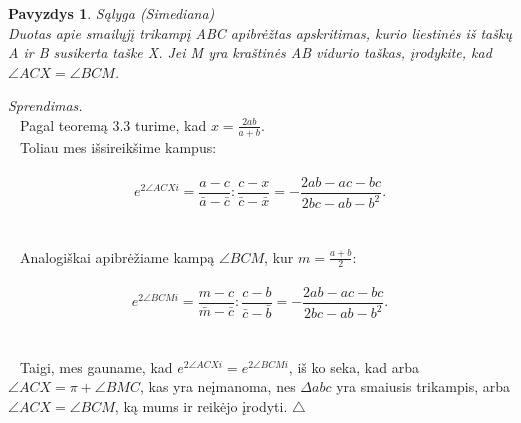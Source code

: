 \documentclass[11pt,a4paper,twoside]{book}
\newenvironment{sprendimas}{\noindent \textit{Sprendimas.}}{\hfill $\triangle$}
\newcounter{foo}[subsection]
\newtheorem{pavnr}[foo]{Pavyzdys}
\theoremstyle{definition} \newtheorem*{api}{Apibrėžimas}
\theoremstyle{remark} \newtheorem*{pastaba}{Pastaba}
\begin{document}
     \begin{pavnr}
Sąlyga (Simediana)
\\ Duotas apie smailųjį trikampį ABC apibrėžtas apskritimas, kurio
liestinės iš taškų A ir B susikerta taške X. Jei M yra kraštinės 
AB vidurio taškas, įrodykite, kad $\angle ACX = \angle BCM$.
\end{pavnr}
\begin{sprendimas}
\\ $\phantom{a}$ Pagal teoremą 3.3 turime, kad $ x= \frac {2ab}{a+b}$.
\\$\phantom{a}$ Toliau mes išsireikšime kampus:
\\
\\ $$ e^{ 2\angle ACX i} = \frac { a-c}{ \bar a - \bar c} : \frac {c-x}{\bar c - \bar x}=
- \frac { 2ab -ac-bc}{2bc - ab- b^2}.$$
\\
\\$\phantom{a}$ Analogiškai apibrėžiame kampą $ \angle BCM $, kur $m = \frac {a+b}{2}$:
\\
\\  $$ e^{2 \angle BCM i} = \frac { m-c}{ \bar m - \bar c} : \frac {c-b}{\bar c - \bar b}=
- \frac { 2ab -ac-bc}{2bc - ab- b^2}.$$
\\
\\$\phantom{a}$ Taigi, mes gauname, kad  $ e^{ 2 \angle ACX i} = e^{2 \angle BCM i}$, iš ko seka, kad arba $ \angle ACX = \pi + \angle BMC$, kas yra neįmanoma, nes $\Delta abc$ yra smaiusis trikampis, arba $\angle ACX = \angle BCM$, ką mums ir reikėjo įrodyti.
\end{sprendimas}
\end{document}
